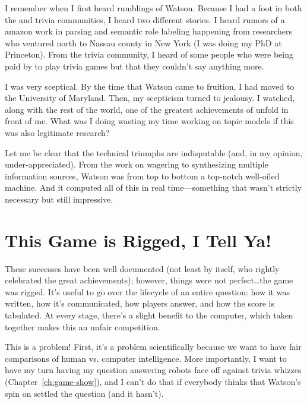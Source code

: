 

I remember when I first heard rumblings of Watson.
%
Because I had a foot in both the  and trivia communities, I
heard two different stories.
%
I heard rumors of a amazon work in parsing and semantic role labeling
happening from researchers who ventured north to Nassau county in New York (I was doing
my PhD at Princeton).
%
From the trivia community, I heard of some people who were being paid
by  to play trivia games but that they couldn't say anything
more.

I was very sceptical.
%
By the time that Watson came to fruition, I had moved to the
University of Maryland.
%
Then, my scepticism turned to jealousy.
%
I watched, along with the rest of the world, one of the greatest
achievements of  unfold in front of me.
%
What was I doing wasting my time working on topic models if this was
also legitimate research?

Let me be clear that the technical triumphs are indisputable (and, in
my opinion, under-appreciated).
%
From the work on wagering to synthesizing multiple information
sources, Watson was from top to bottom a top-notch well-oiled machine.
%
And it computed all of this in real time---something that wasn't
strictly necessary but still impressive.

\section{This Game is Rigged, I Tell Ya!}

These successes have been well documented (not least by  itself, who rightly celebrated the great achievements); however, things were not perfect\dots the game was rigged.  
%
It's useful to go over the lifecycle of an entire question: how it was
written, how it's communicated, how players answer, and how the score
is tabulated.
%
At every stage, there's a slight benefit to the computer, which taken
together makes this an unfair competition.

This is a problem!  First, it's a problem scientifically because we
want to have fair comparisons of human vs. computer intelligence.
%
More importantly, I want to have my turn having my question answering
robots face off against trivia whizzes (Chapter~\ref{ch:game-show}),
and I can't do that if everybody thinks that Watson's spin
on \jeopardy{} settled the question (and it hasn't).


